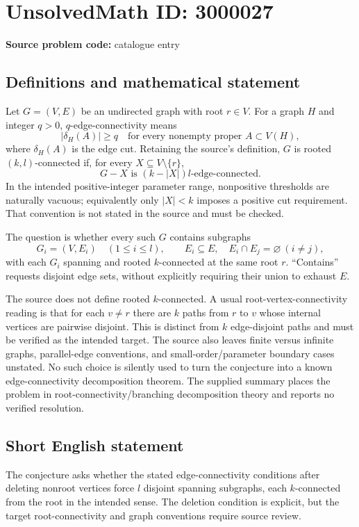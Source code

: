 \documentclass[11pt]{article}
\begin{document}
\section*{UnsolvedMath ID: 3000027}
\textbf{Source problem code:} catalogue entry
\subsection{Definitions and mathematical statement}
Let $G=(V,E)$ be an undirected graph with root $r\in V$. For a graph $H$ and integer $q>0$, $q$-edge-connectivity means
\[
|\delta_H(A)|\geq q
\quad\text{for every nonempty proper }A\subset V(H),
\]
where $\delta_H(A)$ is the edge cut. Retaining the source's definition, $G$ is rooted $(k,l)$-connected if, for every $X\subseteq V\setminus\{r\}$,
\[
G-X\text{ is }(k-|X|)l\text{-edge-connected}.
\]
In the intended positive-integer parameter range, nonpositive thresholds are naturally vacuous; equivalently only $|X|<k$ imposes a positive cut requirement. That convention is not stated in the source and must be checked.

The question is whether every such $G$ contains subgraphs
\[
G_i=(V,E_i)\quad(1\leq i\leq l),\qquad
E_i\subseteq E,\quad E_i\cap E_j=\varnothing\ (i\ne j),
\]
with each $G_i$ spanning and rooted $k$-connected at the same root $r$. ``Contains'' requests disjoint edge sets, without explicitly requiring their union to exhaust $E$.

The source does not define rooted $k$-connected. A usual root-vertex-connectivity reading is that for each $v\ne r$ there are $k$ paths from $r$ to $v$ whose internal vertices are pairwise disjoint. This is distinct from $k$ edge-disjoint paths and must be verified as the intended target. The source also leaves finite versus infinite graphs, parallel-edge conventions, and small-order/parameter boundary cases unstated. No such choice is silently used to turn the conjecture into a known edge-connectivity decomposition theorem. The supplied summary places the problem in root-connectivity/branching decomposition theory and reports no verified resolution.
\subsection{Short English statement}
The conjecture asks whether the stated edge-connectivity conditions after deleting nonroot vertices force $l$ disjoint spanning subgraphs, each $k$-connected from the root in the intended sense. The deletion condition is explicit, but the target root-connectivity and graph conventions require source review.
\end{document}
